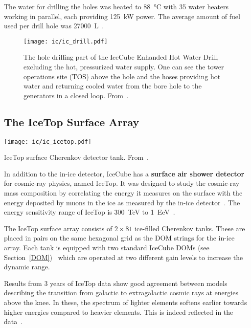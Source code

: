 The water for drilling the holes was heated to \SI{88}{\celsius} with 35 water heaters working in parallel, each providing \SI{125}{\kilo\W} power. The average amount of fuel used per drill hole was \SI{27000}{\liter}~\cite{Benson2014}.

\begin{figure}[]
    \texttt{[image: ic/ic\_drill.pdf]}
    \caption[IceCube enhanced hot water drill]{The hole drilling part of the IceCube Enhanded Hot Water Drill, excluding the hot, pressurized water supply. One can see the tower operations site (TOS) above the hole and the hoses providing hot water and returning cooled water from the bore hole to the generators in a closed loop. From~\cite{Benson2014}.}
\end{figure}

\subsection{The IceTop Surface Array}

\begin{marginfigure}
    \texttt{[image: ic/ic\_icetop.pdf]}
    \caption[IceTop detector]{IceTop surface Cherenkov detector tank. From~\cite{Abbasi2013}.}
\end{marginfigure}

In addition to the in-ice detector, IceCube has a \textbf{surface air shower detector} for cosmic-ray physics, named IceTop. It was designed to study the cosmic-ray mass composition by correlating the energy it measures on the surface with the energy deposited by muons in the ice as measured by the in-ice detector~. The energy sensitivity range of IceTop is \SI{300}{\tera\eV} to \SI{1}{\exa\eV}~.

The IceTop surface array consists of $2\times81$ ice-filled Cherenkov tanks. These are placed in pairs on the same hexagonal grid as the DOM strings for the in-ice array. Each tank is equipped with two standard IceCube DOMs (see Section~\ref{DOM})~\cite{Abbasi2013} which are operated at two different gain levels to increase the dynamic range.

Results from 3 years of IceTop data show good agreement between models describing the transition from galactic to extragalactic cosmic rays at energies above the knee. In these, the spectrum of lighter elements softens earlier towards higher energies compared to heavier elements. This is indeed reflected in the data~.

